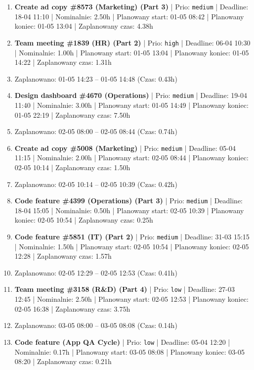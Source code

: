 {\begin{enumerate}
  \item [\textbf{14677}] \textbf{Create ad copy \#8573 (Marketing) (Part 3)} | Prio: \texttt{medium} | Deadline: 18-04 11:10 | Nominalnie: 2.50h | Planowany start: 01-05 08:42 | Planowany koniec: 01-05 13:04 | Zaplanowany czas: 4.38h
  \item [\textbf{14610}] \textbf{Team meeting \#1839 (HR) (Part 2)} | Prio: \texttt{high} | Deadline: 06-04 10:30 | Nominalnie: 1.00h | Planowany start: 01-05 13:04 | Planowany koniec: 01-05 14:22 | Zaplanowany czas: 1.31h
  \item [\textbf{PRZERWA}] Zaplanowano: 01-05 14:23 -- 01-05 14:48 (Czas: 0.43h)
  \item [\textbf{14676}] \textbf{Design dashboard \#4670 (Operations)} | Prio: \texttt{medium} | Deadline: 19-04 11:40 | Nominalnie: 3.00h | Planowany start: 01-05 14:49 | Planowany koniec: 01-05 22:19 | Zaplanowany czas: 7.50h
  \item [\textbf{PRZERWA}] Zaplanowano: 02-05 08:00 -- 02-05 08:44 (Czas: 0.74h)
  \item [\textbf{14666}] \textbf{Create ad copy \#5008 (Marketing)} | Prio: \texttt{medium} | Deadline: 05-04 11:15 | Nominalnie: 2.00h | Planowany start: 02-05 08:44 | Planowany koniec: 02-05 10:14 | Zaplanowany czas: 1.50h
  \item [\textbf{PRZERWA}] Zaplanowano: 02-05 10:14 -- 02-05 10:39 (Czas: 0.42h)
  \item [\textbf{14664}] \textbf{Code feature \#4399 (Operations) (Part 3)} | Prio: \texttt{medium} | Deadline: 18-04 15:05 | Nominalnie: 0.50h | Planowany start: 02-05 10:39 | Planowany koniec: 02-05 10:54 | Zaplanowany czas: 0.25h
  \item [\textbf{14643}] \textbf{Code feature \#5851 (IT) (Part 2)} | Prio: \texttt{medium} | Deadline: 31-03 15:15 | Nominalnie: 1.50h | Planowany start: 02-05 10:54 | Planowany koniec: 02-05 12:28 | Zaplanowany czas: 1.57h
  \item [\textbf{PRZERWA}] Zaplanowano: 02-05 12:29 -- 02-05 12:53 (Czas: 0.41h)
  \item [\textbf{14688}] \textbf{Team meeting \#3158 (R\&D) (Part 4)} | Prio: \texttt{low} | Deadline: 27-03 12:45 | Nominalnie: 2.50h | Planowany start: 02-05 12:53 | Planowany koniec: 02-05 16:38 | Zaplanowany czas: 3.75h
  \item [\textbf{PRZERWA}] Zaplanowano: 03-05 08:00 -- 03-05 08:08 (Czas: 0.14h)
  \item [\textbf{14703}] \textbf{Code feature (App QA Cycle)} | Prio: \texttt{low} | Deadline: 05-04 12:20 | Nominalnie: 0.17h | Planowany start: 03-05 08:08 | Planowany koniec: 03-05 08:20 | Zaplanowany czas: 0.21h

\end{enumerate}}
